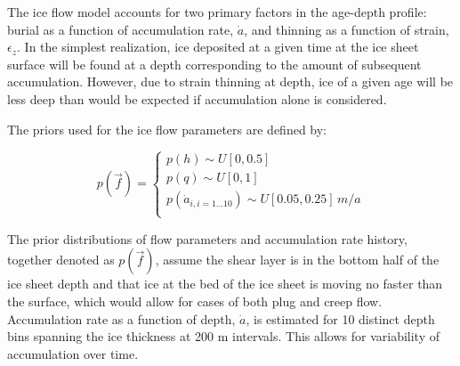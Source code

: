 The ice flow model accounts for two primary factors in the age-depth profile: burial as a function of accumulation rate, $\dot{a}$, and thinning as a function of strain, $\epsilon_z$. In the simplest realization, ice deposited at a given time at the ice sheet surface will be found at a depth corresponding to the amount of subsequent accumulation. However, due to strain thinning at depth, ice of a given age will be less deep than would be expected if accumulation alone is considered. 


The priors used for the ice flow parameters are defined by:

\begin{center}
\begin{equation}\label{priors}
p(\vec{f}) = 
\begin{cases}
p(h) \sim U[0, 0.5] \\
p(q) \sim U[0, 1] \\
p(\dot{a}_{i, i=1...10}) \sim U[0.05,0.25]\,m/a\\
\end{cases}	
\end{equation}	
\end{center}

The prior distributions of flow parameters and accumulation rate history, together denoted as $p(\vec{f})$, assume the shear layer is in the bottom half of the ice sheet depth \citep{cuffey2010} and that ice at the bed of the ice sheet is moving no faster than the surface, which would allow for cases of both plug and creep flow. Accumulation rate as a function of depth, $\dot{a}$, is estimated for 10 distinct depth bins spanning the ice thickness at 200 m intervals. This allows for variability of accumulation over time. 
